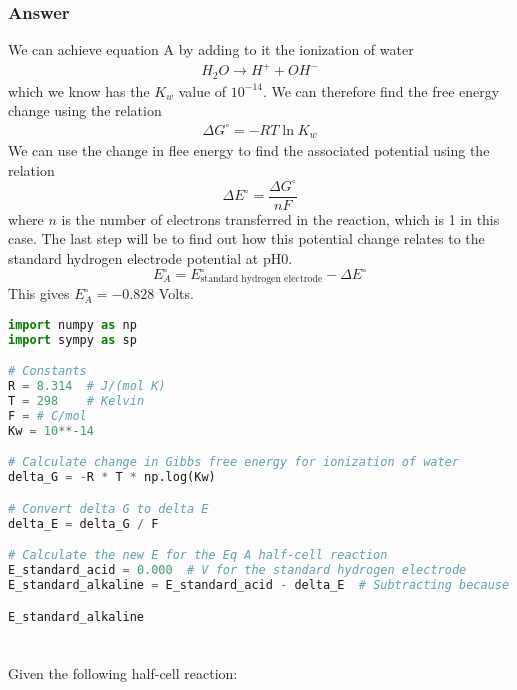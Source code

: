 \documentclass[12pt]{article}
\begin{document}
\subsubsection{Answer}
We can achieve equation A by adding to it the ionization of water
\begin{equation}
\begin{aligned}
H_{2} O \rightarrow H^{+}+OH^{-}
\end{aligned}
\end{equation}
which we know has the $K_{w}$ value of $10^{-14}$. We can therefore find the free energy change using the relation
\begin{equation}
\begin{aligned}
\Delta G^{\circ}=-RT \ln K_{w}
\end{aligned}
\end{equation}
We can use the change in flee energy to find the associated potential using the relation
\begin{equation}
\Delta E ^{\circ} = \frac{\Delta G^{\circ}}{nF}
\end{equation}
where $n$ is the number of electrons transferred in the reaction, which is 1 in this case. The last step will be to find out how this potential change relates to the standard hydrogen electrode potential at $\mathrm{pH} 0$.
\begin{equation}
  E_{A}^{\circ} = E_{\text{standard hydrogen electrode}}^{\circ} - \Delta E^{\circ}
\end{equation}
This gives $E_{A}^{\circ} = -0.828$ Volts.
\begin{lstlisting}[language=Python]
import numpy as np
import sympy as sp

# Constants
R = 8.314  # J/(mol K)
T = 298    # Kelvin
F = # C/mol
Kw = 10**-14

# Calculate change in Gibbs free energy for ionization of water
delta_G = -R * T * np.log(Kw)

# Convert delta G to delta E
delta_E = delta_G / F

# Calculate the new E for the Eq A half-cell reaction
E_standard_acid = 0.000  # V for the standard hydrogen electrode
E_standard_alkaline = E_standard_acid - delta_E  # Subtracting because we are moving from acid to alkaline

E_standard_alkaline

\end{lstlisting}

\section{}
Given the following half-cell reaction:
\end{document}
